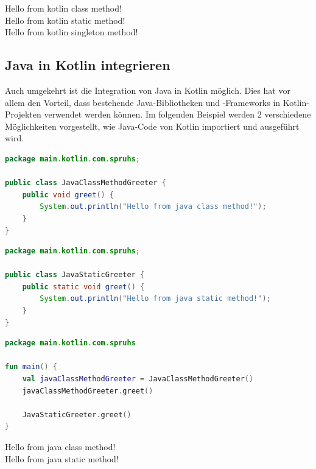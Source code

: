 \documentclass[11pt]{article}
\begin{document}
    \begin{tcolorbox}[colback=black!5!white, colframe=black, title=Ausgabe]
        Hello from kotlin class method!\\
        Hello from kotlin static method!\\
        Hello from kotlin singleton method!
    \end{tcolorbox}
    
    \subsection{Java in Kotlin integrieren}
    Auch umgekehrt ist die Integration von Java in Kotlin möglich. Dies hat vor allem den Vorteil, dass bestehende Java-Bibliotheken und -Frameworks
    in Kotlin-Projekten verwendet werden können. Im folgenden Beispiel werden 2 verschiedene Möglichkeiten vorgestellt, wie Java-Code von Kotlin importiert und ausgeführt wird.

    \begin{lstlisting}[language=Java, caption={JavaClassMethodGreeter.java}]
package main.kotlin.com.spruhs;

public class JavaClassMethodGreeter {
    public void greet() {
        System.out.println("Hello from java class method!");
    }
}
    \end{lstlisting}

    \begin{lstlisting}[language=Java, caption={JavaStaticGreeter.java}]
package main.kotlin.com.spruhs;

public class JavaStaticGreeter {
    public static void greet() {
        System.out.println("Hello from java static method!");
    }
}

    \end{lstlisting}

    \begin{lstlisting}[language=Kotlin, caption={Main.kt}]
package main.kotlin.com.spruhs

fun main() {
    val javaClassMethodGreeter = JavaClassMethodGreeter()
    javaClassMethodGreeter.greet()

    JavaStaticGreeter.greet()
}
    \end{lstlisting}

    \begin{tcolorbox}[colback=black!5!white, colframe=black, title=Ausgabe]
        Hello from java class method!\\
        Hello from java static method!\\
    \end{tcolorbox}
\end{document}
